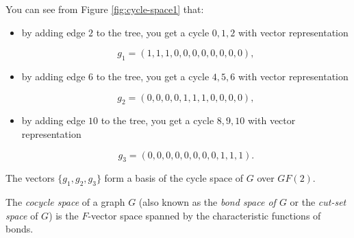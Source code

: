 \begin{example}
{You can see from Figure \ref{fig:cycle-space1} that:

\begin{itemize}
\item
by adding edge $2$ to the tree, you get a cycle $0,1,2$ with vector
representation

\[
g_1 = (1,1,1,0,0,0,0,0,0,0,0),
\]
\item
by adding edge $6$ to the tree, you get a cycle $4,5,6$ with vector
representation

\[
g_2 = (0,0,0,0,1,1,1,0,0,0,0),
\]
\item
by adding edge $10$ to the tree, you get a cycle $8,9,10$ with vector
representation

\[
g_3 = (0,0,0,0,0,0,0,0,1,1,1).
\]
\end{itemize}
The vectors $\{g_1,g_2,g_3\}$ form a basis of the cycle space
of $G$ over $GF(2)$.
}
\end{example}

The {\it cocycle space} of a graph $G$ (also known as
the {\it bond space of $G$} or the {\it cut-set space} of $G$)
is the $F$-vector space spanned by the characteristic
functions of bonds.


